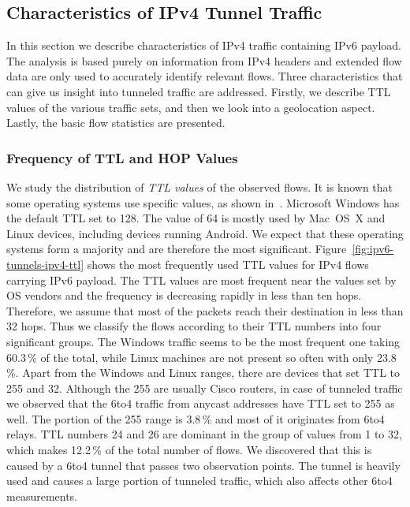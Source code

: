 \subsection{Characteristics of IPv4 Tunnel Traffic} \label{subsec:ipv6-tunnels-outer-traffic-evaluation}

In this section we describe characteristics of IPv4 traffic containing IPv6 payload. The analysis is based purely on information from IPv4 headers and extended flow data are only used to accurately identify relevant flows. Three characteristics that can give us insight into tunneled traffic are addressed. Firstly, we describe TTL values of the various traffic sets, and then we look into a geolocation aspect. Lastly, the basic flow statistics are presented.

\subsubsection{Frequency of TTL and HOP Values}
We study the distribution of \textit{TTL values} of the observed flows. It is known that some operating systems use specific values, as shown in~\cite{Davids-2017-Initial}. Microsoft Windows has the default TTL set to 128. The value of 64 is mostly used by Mac~OS~X and Linux devices, including devices running Android. We expect that these operating systems form a majority and are therefore the most significant. Figure~\ref{fig:ipv6-tunnels-ipv4-ttl} shows the most frequently used TTL values for IPv4 flows carrying IPv6 payload. The TTL values are most frequent near the values set by OS vendors and the frequency is decreasing rapidly in less than ten hops. Therefore, we assume that most of the packets reach their destination in less than 32 hops. Thus we classify the flows according to their TTL numbers into four significant groups. The Windows traffic seems to be the most frequent one taking 60.3\,\% of the total, while Linux machines are not present so often with only 23.8\,\%. Apart from the Windows and Linux ranges, there are devices that set TTL to 255 and 32. Although the 255 are usually Cisco routers, in case of tunneled traffic we observed that the 6to4 traffic from anycast addresses have TTL set to 255 as well. The portion of the 255 range is 3.8\,\% and most of it originates from 6to4 relays. TTL numbers 24 and 26 are dominant in the group of values from 1 to 32, which makes 12.2\,\% of the total number of flows. We discovered that this is caused by a 6to4 tunnel that passes two observation points. The tunnel is heavily used and causes a large portion of tunneled traffic, which also affects other 6to4 measurements.

